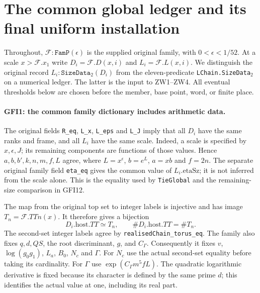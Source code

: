 \section{The common global ledger and its final uniform installation}
\label{sec:global-final-installation-v035}


Throughout, $\mathcal F:\texttt{FamP}(\epsilon)$ is the supplied
original family, with $0<\epsilon<1/52$.  At a scale $x>\mathcal F.x_1$
write $D_i=\mathcal F.D(x,i)$ and $L_i=\mathcal F.L(x,i)$.
We distinguish the original record $L_i:\texttt{SizeData}_2(D_i)$
from the eleven-predicate \texttt{LChain.SizeData}$_2$ on a numerical
ledger.  The latter is the input to ZW1--ZW4.  All eventual thresholds
below are chosen before the member, base point, word, or finite place.

\paragraph{GFI1: the common family dictionary includes arithmetic data.}
\label{claim:GFI1}
The original fields \texttt{R\_eq}, \texttt{L\_x},
\texttt{L\_eps} and \texttt{L\_J} imply that all $D_i$ have the
same ranks and frame, and all $L_i$ have the same scale.  Indeed, a
scale is specified by $x,\epsilon,J$; its remaining components are
functions of those values.  Hence $a,b,b',k,n,m,f,L$ agree, where
$L=x^\epsilon$, $b=e^L$, $a=xb$ and $f=2n$.
The separate original family field \texttt{eta\_eq} gives the
common value of $L_i.\mathrm{etaSz}$; it is not inferred from
the scale alone.  This is the equality used by \texttt{TieGlobal}
and the remaining-size comparison in GFI12.

The map from the original top set to integer labels is injective and
has image $T_n=\mathcal F.TTn(x)$.  It therefore gives a bijection
\[
 D_i.\mathrm{host}.TT\simeq T_n,
 \qquad \#D_i.\mathrm{host}.TT=\#T_n.                 \tag{GFI.1}
\]
The second-set integer labels agree by
\texttt{realisedChain\_torus\_eq}.  The family also fixes $q,d,QS$,
the root discriminant, $g$, and $C_\Gamma$.  Consequently it fixes
$v$, $\log(g_0g_1)$, $L_a$, $B_0$, $N_c$ and $\Gamma$.
For $N_c$ use the actual second-set equality before taking its
cardinality.  For $\Gamma$ use
$\exp(C_\Gamma m^5 fL)$.  The quadratic logarithmic derivative
is fixed because its character is defined by the same prime $d$;
this identifies the actual value at one, including its real part.

